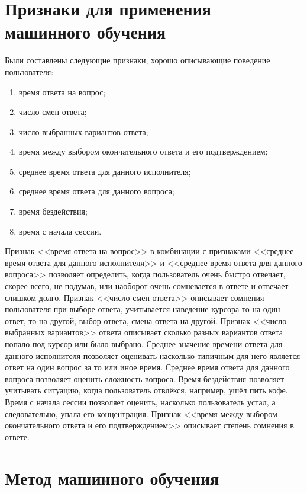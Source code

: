 \documentclass[specification,annotation,times]{itmo-student-thesis}
\begin{document}
\section{Признаки для применения машинного обучения}
Были составлены следующие признаки, хорошо описывающие поведение пользователя:
\begin{enumerate}
    \item время ответа на вопрос;
    \item число смен ответа;
    \item число выбранных вариантов ответа;
    \item время между выбором окончательного ответа и его подтверждением;
    \item среднее время ответа для данного исполнителя;
    \item среднее время ответа для данного вопроса;
    \item время бездействия;
    \item время с начала сессии.
\end{enumerate}

Признак <<время ответа на вопрос>> в комбинации с признаками <<среднее время ответа для данного исполнителя>> и <<среднее время ответа для данного вопроса>> позволяет определить,  когда пользователь очень быстро отвечает, скорее всего, не подумав, или наоборот очень сомневается в ответе и отвечает слишком долго. Признак <<число смен ответа>> описывает сомнения пользователя при выборе ответа, учитывается наведение курсора то на один ответ, то на другой, выбор ответа, смена ответа на другой. Признак <<число выбранных вариантов>> ответа описывает сколько разных вариантов ответа попало под курсор или было выбрано. Среднее значение времени ответа для данного исполнителя позволяет оценивать насколько типичным для него является ответ на один вопрос за то или иное время. Среднее время ответа для данного вопроса позволяет оценить сложность вопроса. Время бездействия позволяет учитывать ситуацию, когда пользователь отвлёкся, например, ушёл пить кофе. Время с начала сессии позволяет оценить, насколько пользователь устал, а следовательно, упала его концентрация. Признак <<время между выбором окончательного ответа и его подтверждением>> описывает степень сомнения в ответе.

\section{Метод машинного обучения}
\end{document}
